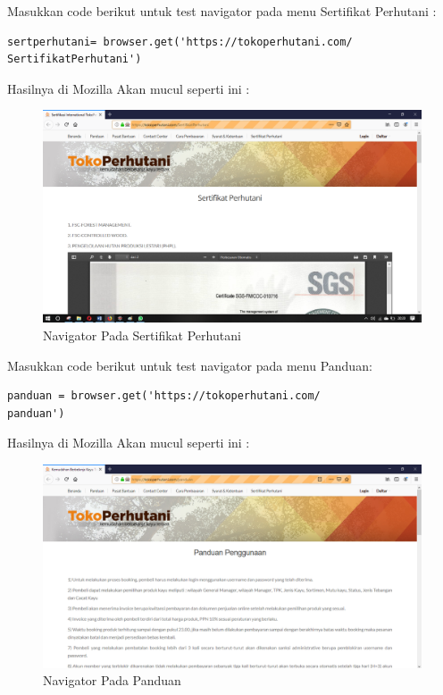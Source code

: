 Masukkan code berikut untuk test navigator pada menu Sertifikat Perhutani :

\begin{verbatim}
sertperhutani= browser.get('https://tokoperhutani.com/
SertifikatPerhutani')
\end{verbatim}

Hasilnya  di Mozilla Akan mucul seperti ini :
\begin{figure}[h]
	\centering
	\includegraphics[scale=0.25]{figures/3}
	\caption{Navigator Pada Sertifikat Perhutani}
\end{figure}

Masukkan code berikut untuk test navigator pada menu  Panduan:
\begin{verbatim}
panduan = browser.get('https://tokoperhutani.com/
panduan')
\end{verbatim}

Hasilnya  di Mozilla Akan mucul seperti ini :
\begin{figure}[h]
	\centering
	\includegraphics[scale=0.28]{figures/1hasil.PNG}
	\caption{Navigator Pada Panduan}
\end{figure}

